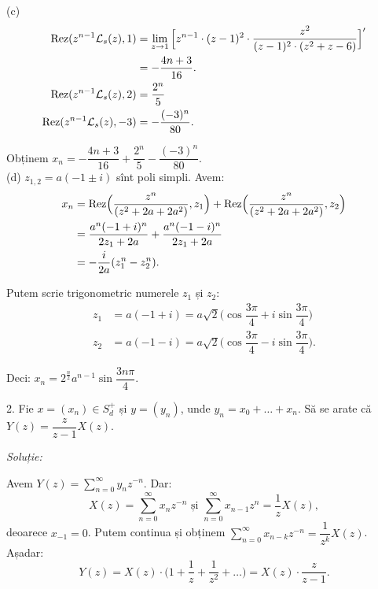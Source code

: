 (c)
\begin{align*}
  \mathrm{Rez}(z^{n-1} \mathcal{L}_s(z), 1) &= \lim_{z\to 1} \Big[ z^{n-1} \cdot (z-1)^2 \cdot 
                               \dfrac{z^2}{(z-1)^2 \cdot (z^2 + z - 6)} \Big]^{\prime}\\
                             &= - \dfrac{4n + 3}{16}. \\
  \mathrm{Rez}(z^{n-1} \mathcal{L}_s(z), 2) &= \dfrac{2^n}{5} \\
  \mathrm{Rez}(z^{n-1} \mathcal{L}_s(z), -3) &= -\dfrac{(-3)^n}{80}.
\end{align*}

Obținem $x_n = - \dfrac{4n+3}{16} + \dfrac{2^n}{5} - \dfrac{(-3)^n}{80}$. \\

(d) $z_{1,2} = a (-1 \pm i)$ sînt poli simpli. Avem:
\begin{align*}
  x_n &= \mathrm{Rez}\Big( \dfrac{z^n}{(z^2 + 2a + 2a^2)}, z_1 \Big) + 
        \mathrm{Rez}\Big(  \dfrac{z^n}{(z^2 + 2a + 2a^2)}, z_2 \Big) \\
      &= \dfrac{a^n(-1 + i)^n}{2z_1 + 2a} + \dfrac{a^n(-1-i)^n}{2z_1 + 2a} \\
      &= -\dfrac{i}{2a}(z_1^n - z_2^n).
\end{align*}

Putem scrie trigonometric numerele $z_1$ și $z_2$:
\begin{align*}
  z_1 &= a(-1 + i) = a \sqrt{2} \Big( \cos \dfrac{3\pi}{4} + 
        i \sin \dfrac{3 \pi}{4} \Big) \\
  z_2 &= a(-1 - i) = a \sqrt{2} \Big( \cos \dfrac{3 \pi}{4} - 
        i \sin \dfrac{3 \pi}{4} \Big).
\end{align*}

Deci: $x_n = 2^{\frac{n}{2}} a^{n-1} \sin \dfrac{3 n \pi}{4}$.



\vspace{1cm}

2. Fie $x = (x_n) \in S_d^+$ și $y = (y_n)$, unde $y_n = x_0 + \dots + x_n$. 
Să se arate că $Y(z) = \dfrac{z}{z-1} X(z)$.

\emph{Soluție:}

Avem $Y(z) = \displaystyle\sum_{n=0}^\infty y_n z^{-n}.$ Dar: 
\[
  X(z) = \sum_{n=0}^\infty x_n z^{-n} \text{ și } 
  \sum_{n=0}^\infty x_{n-1} z^n = \dfrac{1}{z} X(z),
\]
deoarece $x_{-1} = 0$. Putem continua și obținem 
$\displaystyle\sum_{n=0}^\infty x_{n-k} z^{-n} = \dfrac{1}{z^k} X(z)$. Așadar: 
\[
  Y(z) = X(z) \cdot \Big( 1 + \dfrac{1}{z} + \dfrac{1}{z^2} + \dots \Big) 
  = X(z) \cdot \dfrac{z}{z-1}.
\]


